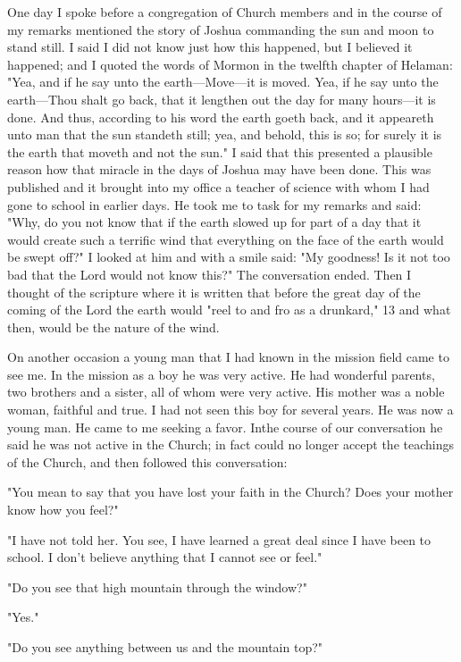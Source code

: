 One day I spoke before a congregation of Church members and in the course of my remarks
mentioned the story of Joshua commanding the sun and moon to stand still. I said I did not
know just how this happened, but I believed it happened; and I quoted the words of Mormon
in the twelfth chapter of Helaman: "Yea, and if he say unto the earth—Move—it is moved.
Yea, if he say unto the earth—Thou shalt go back, that it lengthen out the day for many
hours—it is done. And thus, according to his word the earth goeth back, and it appeareth unto
man that the sun standeth still; yea, and behold, this is so; for surely it is the earth that
moveth and not the sun." I said that this presented a plausible reason how that miracle in the
days of Joshua may have been done. This was published and it brought into my office a
teacher of science with whom I had gone to school in earlier days. He took me to task for my
remarks and said: "Why, do you not know that if the earth slowed up for part of a day that it
would create such a terrific wind that everything on the face of the earth would be swept
off?" I looked at him and with a smile said: "My goodness! Is it not too bad that the Lord
would not know this?" The conversation ended. Then I thought of the scripture where it is
written that before the great day of the coming of the Lord the earth would "reel to and fro as
a drunkard," 13 and what then, would be the nature of the wind.

On another occasion a young man that I had known in the mission field came to see me. In
the mission as a boy he was very active. He had wonderful parents, two brothers and a sister,
all of whom were very active. His mother was a noble woman, faithful and true. I had not
seen this boy for several years. He was now a young man. He came to me seeking a favor. Inthe course of our conversation he said he was not active in the Church; in fact could no
longer accept the teachings of the Church, and then followed this conversation:

"You mean to say that you have lost your faith in the Church? Does your mother know how
you feel?"

"I have not told her. You see, I have learned a great deal since I have been to school. I don't
believe anything that I cannot see or feel."

"Do you see that high mountain through the window?"

"Yes."

"Do you see anything between us and the mountain top?"

